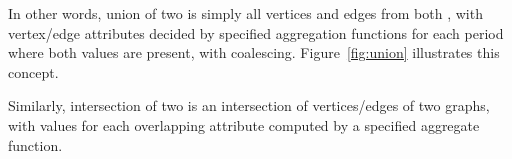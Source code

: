 In other words, union of two \tgs is simply all vertices and edges
from both \tgs, with vertex/edge attributes decided by specified
aggregation functions for each period where both values are present,
with coalescing.  Figure~\ref{fig:union} illustrates this concept.

Similarly, intersection of two \tgs is an intersection of
vertices/edges of two graphs, with values for each overlapping
attribute computed by a specified aggregate function.

